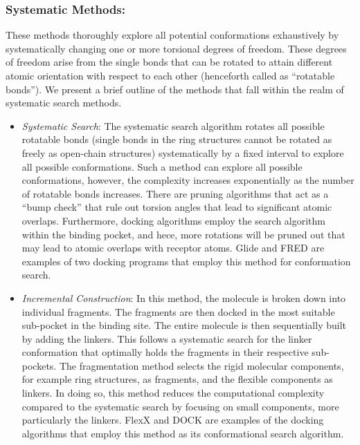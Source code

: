 \subsubsection*{Systematic Methods:}
These methods thoroughly explore all potential conformations exhaustively by systematically changing one or more torsional degrees of freedom. These degrees of freedom arise from the single bonds that can be rotated to attain different atomic orientation with respect to each other (henceforth called as “rotatable bonds”).  We present a brief outline of the methods that fall within the realm of systematic search methods.  
\begin{itemize}
    \item \textit{Systematic Search}: The systematic search algorithm\cite{bib14} rotates all possible rotatable bonds (single bonds in the ring structures cannot be rotated as freely as open-chain structures) systematically by a fixed interval to explore all possible conformations. Such a method can explore all possible conformations, however, the complexity increases exponentially as the number of rotatable bonds increases. There are pruning algorithms that act as a “bump check” that rule out torsion angles that lead to significant atomic overlaps. Furthermore, docking algorithms employ the search algorithm within the binding pocket, and hece, more rotations will be pruned out that 
    may lead to atomic overlaps with receptor atoms. Glide\cite{bib15} and FRED\cite{bib16} are examples of two docking programs that employ this method for conformation search. 

    \item \textit{Incremental Construction}: In this method\cite{bib17}, the molecule is broken down into individual fragments. The fragments are then docked in the most suitable sub-pocket in the binding site. The entire molecule is then sequentially built by adding the linkers. This follows a systematic search for the linker conformation that optimally holds the fragments in their respective sub-pockets. The fragmentation method selects the rigid molecular components, for example ring structures, as fragments, and the flexible components as linkers. In doing so, this method reduces the computational complexity compared to the systematic search by focusing on small components, more particularly the linkers. FlexX\cite{bib19} and DOCK\cite{bib18} are examples of the docking algorithms that employ this method as its conformational search algorithm.
\end{itemize}

